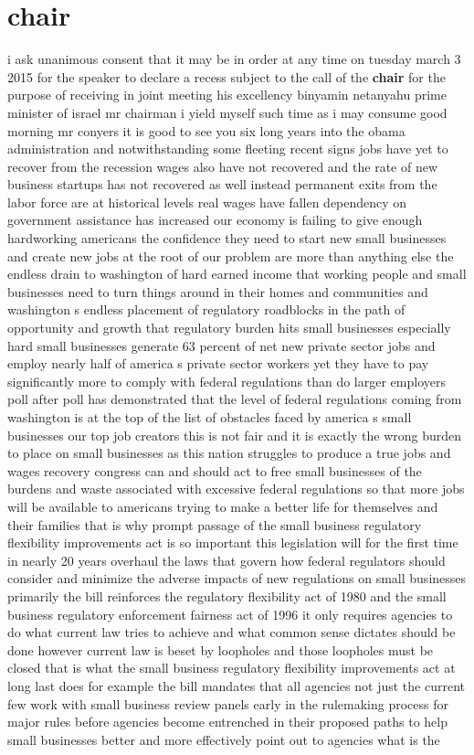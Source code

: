 \documentclass{article}
\begin{document}
\section*{chair}
i ask unanimous consent that it may be in order at any time on tuesday march 3 2015 for the speaker to declare a recess subject to the call of the {\bf \color{red} chair} for the purpose of receiving in joint meeting his excellency binyamin netanyahu prime minister of israel
\vspace{8mm}
mr chairman i yield myself such time as i may consume good morning mr conyers it is good to see you six long years into the obama administration and notwithstanding some fleeting recent signs jobs have yet to recover from the recession wages also have not recovered and the rate of new business startups has not recovered as well instead permanent exits from the labor force are at historical levels real wages have fallen dependency on government assistance has increased our economy is failing to give enough hardworking americans the confidence they need to start new small businesses and create new jobs at the root of our problem are more than anything else the endless drain to washington of hard earned income that working people and small businesses need to turn things around in their homes and communities and washington s endless placement of regulatory roadblocks in the path of opportunity and growth that regulatory burden hits small businesses especially hard small businesses generate 63 percent of net new private sector jobs and employ nearly half of america s private sector workers yet they have to pay significantly more to comply with federal regulations than do larger employers poll after poll has demonstrated that the level of federal regulations coming from washington is at the top of the list of obstacles faced by america s small businesses our top job creators this is not fair and it is exactly the wrong burden to place on small businesses as this nation struggles to produce a true jobs and wages recovery congress can and should act to free small businesses of the burdens and waste associated with excessive federal regulations so that more jobs will be available to americans trying to make a better life for themselves and their families that is why prompt passage of the small business regulatory flexibility improvements act is so important this legislation will for the first time in nearly 20 years overhaul the laws that govern how federal regulators should consider and minimize the adverse impacts of new regulations on small businesses primarily the bill reinforces the regulatory flexibility act of 1980 and the small business regulatory enforcement fairness act of 1996 it only requires agencies to do what current law tries to achieve and what common sense dictates should be done however current law is beset by loopholes and those loopholes must be closed that is what the small business regulatory flexibility improvements act at long last does for example the bill mandates that all agencies not just the current few work with small business review panels early in the rulemaking process for major rules before agencies become entrenched in their proposed paths to help small businesses better and more effectively point out to agencies what is the 
\end{document}
